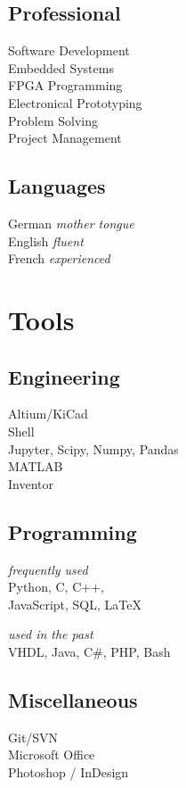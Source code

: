 \documentclass[]{deedy-resume-openfont}
\begin{document}
\begin{minipage}[t]{0.33\textwidth}
\subsection{Professional}
Software Development\\
Embedded Systems\\
FPGA Programming\\
Electronical Prototyping\\
Problem Solving\\
Project Management
\sectionsep

\subsection{Languages}
German \textit{mother tongue}\\
English \textit{fluent}\\
French  \textit{experienced}
\sectionsep

\section{Tools}
\subsection{Engineering}
Altium/KiCad\\
Shell\\
Jupyter, Scipy, Numpy, Pandas\\
MATLAB\\
Inventor
\sectionsep

\subsection{Programming}
\textit{frequently used}\\
Python, C, C++,\\
JavaScript, SQL, LaTeX
\sectionsep

\textit{used in the past}\\
VHDL, Java, C\#, PHP, Bash
\sectionsep

\subsection{Miscellaneous}
Git/SVN\\
Microsoft Office\\
Photoshop / InDesign
\sectionsep

%
%

\end{minipage}
\end{document}
